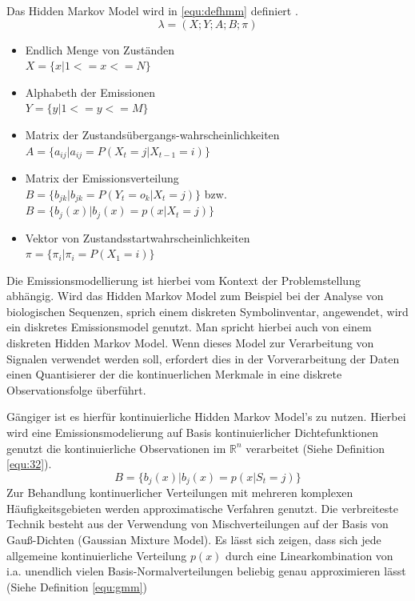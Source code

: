 Das Hidden Markov Model wird in \ref{equ:defhmm} definiert \cite[68]{mmmFink}. 
\begin{equation}
\label{equ:defhmm}
\lambda = (X;Y;A;B;\pi)
\end{equation}
\begin{itemize}
     \item Endlich Menge von Zuständen \\
           \( X = \{ x | 1 <= x <= N \} \)
     \item Alphabeth der Emissionen \\
           \( Y = \{ y | 1 <= y <= M \} \)
     \item Matrix der Zustandsübergangs-wahrscheinlichkeiten \\
           \( A = \{ a_{ij} | a_{ij} = P(X_t = j | X_{t-1} = i) \} \)
     \item Matrix der Emissionsverteilung \\
           \( B = \{ b_{jk} | b_{jk} = P(Y_t = o_k | X_t = j) \} \) bzw. \\
           \( B = \{ b_{j}(x) | b_{j}(x) = p(x|X_t = j) \} \)
     \item Vektor von Zustandsstartwahrscheinlichkeiten \\
           \( \pi = \{ \pi_i | \pi_i = P(X_1 = i) \} \) 
\end{itemize}


Die Emissionsmodellierung ist hierbei vom Kontext der Problemstellung abhängig. Wird das Hidden Markov Model zum Beispiel bei der Analyse von biologischen Sequenzen, sprich einem diskreten Symbolinventar, angewendet, wird ein diskretes  Emissionsmodel genutzt. Man spricht hierbei auch von einem diskreten Hidden Markov Model. Wenn dieses Model zur Verarbeitung von Signalen verwendet werden soll, erfordert dies in der Vorverarbeitung der Daten einen Quantisierer der die kontinuerlichen Merkmale in eine diskrete Observationsfolge überführt. 

Gängiger ist es hierfür kontinuierliche Hidden Markov Model's zu nutzen. Hierbei wird eine Emissionsmodelierung auf Basis kontinuierlicher Dichtefunktionen genutzt die kontinuierliche Observationen im \(\mathbb{R}^n\) verarbeitet (Siehe Definition \ref{equ:32}).
\begin{equation}
\label{equ:32}
B =\{ b_{j}(x) | b_{j}(x) = p(x|S_t = j) \}
\end{equation}
Zur Behandlung kontinuerlicher Verteilungen mit mehreren komplexen Häufigkeitsgebieten werden approximatische Verfahren genutzt. Die verbreiteste Technik besteht aus der Verwendung von Mischverteilungen auf der Basis von Gauß-Dichten (Gaussian Mixture Model). Es lässt sich  zeigen, dass sich jede allgemeine kontinuierliche Verteilung \(p(x)\) durch eine Linearkombination von i.a. unendlich vielen Basis-Normalverteilungen beliebig genau approximieren lässt \cite[69]{mmmFink} (Siehe Definition \ref{equ:gmm})
 
